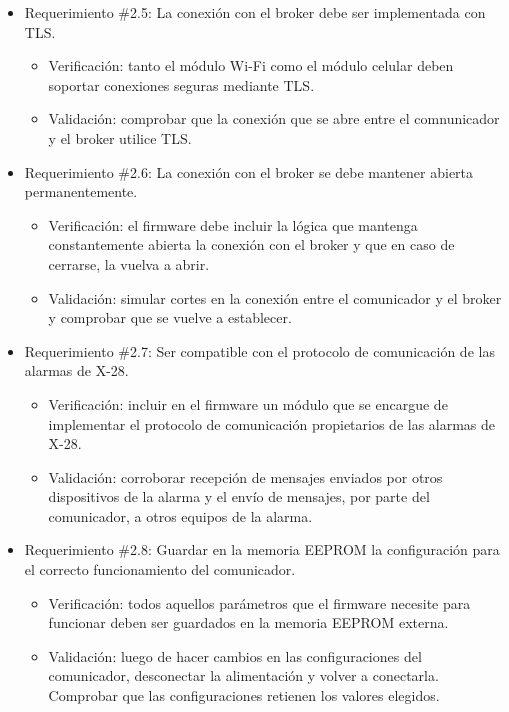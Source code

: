 \documentclass[
11pt, %
codirector, %
]{charter}
\begin{document}
\begin{itemize}
	\item Requerimiento \#2.5: La conexión con el broker debe ser implementada con TLS.
	\begin{itemize}
		\item Verificación: tanto el módulo Wi-Fi como el módulo celular deben soportar conexiones seguras mediante TLS.
		\item Validación: comprobar que la conexión que se abre entre el comnunicador y el broker utilice TLS.
	\end{itemize}
			
	\item Requerimiento \#2.6: La conexión con el broker se debe mantener abierta permanentemente.
	\begin{itemize}
		\item Verificación: el firmware debe incluir la lógica que mantenga constantemente abierta la conexión con el broker y que en caso de cerrarse, la vuelva a abrir.
		\item Validación: simular cortes en la conexión entre el comunicador y el broker y comprobar que se vuelve a establecer.
	\end{itemize}
			
	\item Requerimiento \#2.7: Ser compatible con el protocolo de comunicación de las alarmas de X-28.
	\begin{itemize}
		\item Verificación: incluir en el firmware un módulo que se encargue de implementar el protocolo de comunicación propietarios de las alarmas de X-28.
		\item Validación: corroborar recepción de mensajes enviados por otros dispositivos de la alarma y el envío de mensajes, por parte del comunicador, a otros equipos de la alarma.
	\end{itemize}
			
	\item Requerimiento \#2.8: Guardar en la memoria EEPROM la configuración para el correcto funcionamiento del comunicador.
	\begin{itemize}
		\item Verificación: todos aquellos parámetros que el firmware necesite para funcionar deben ser guardados en la memoria EEPROM externa.
		\item Validación: luego de hacer cambios en las configuraciones del comunicador, desconectar la alimentación y volver a conectarla. Comprobar que las configuraciones retienen los valores elegidos.
	\end{itemize}
			

\end{itemize}
\end{document}
